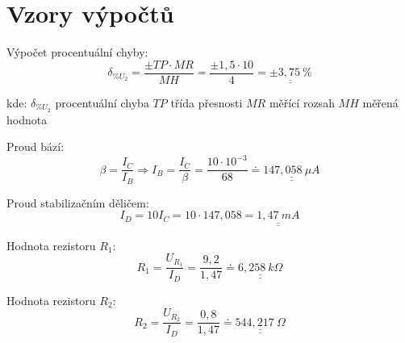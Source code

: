 \section*{Vzory výpočtů}
  
  Výpočet procentuální chyby:
  \begin{equation}
    \delta _{\%U_2} = \dfrac{\pm TP \cdot MR}{MH} = \dfrac{\pm 1,5 \cdot 10}{4} = \underline{\underline{\pm 3,75~\%}}
    \nonumber
  \end{equation}
  
  \hspace*{2cm}kde:\newline    
  	\hspace*{4cm}$\delta _{\%U_2}$ \dotfill procentuální chyba\hspace*{4cm}\newline
  	\hspace*{4cm}$TP$ \dotfill třída přesnosti\hspace*{4cm}\newline
  	\hspace*{4cm}$MR$ \dotfill měřící rozsah\hspace*{4cm}\newline
  	\hspace*{4cm}$MH$ \dotfill měřená hodnota\hspace*{4cm}\newline
  
  Proud bází:
  \begin{equation}
    \beta = \dfrac{I_C}{I_B} \Rightarrow I_B = \dfrac{I_C}{\beta} = \dfrac{10 \cdot 10^{-3}}{68} \doteq \underline{\underline{147,058~\mu A}}
    \nonumber
  \end{equation} 
  
  
  Proud stabilizačním děličem:
  \begin{equation}
    I_D = 10I_C = 10 \cdot 147,058 = \underline{\underline{1,47~mA}}
    \nonumber
  \end{equation}
  
  Hodnota rezistoru $R_1$:
  \begin{equation}
    R_1 = \dfrac{U_{R_1}}{I_D} = \dfrac{9,2}{1,47} \doteq \underline{\underline{6,258~k\Omega}}
    \nonumber
  \end{equation} 
  
  Hodnota rezistoru $R_2$:
  \begin{equation}
    R_2 = \dfrac{U_{R_2}}{I_D} = \dfrac{0,8}{1,47} \doteq \underline{\underline{544,217~\Omega}}
    \nonumber
  \end{equation} 
  
